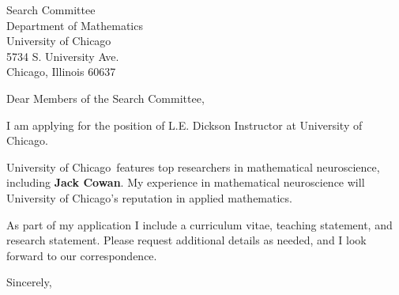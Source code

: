 \documentclass[11pt,a4paper]{letter}
\begin{document}

\def\School{University of Chicago}

\begin{letter}
{Search Committee\\
Department of Mathematics\\
University of Chicago\\
5734 S. University Ave.\\
Chicago, Illinois 60637}


\opening{Dear Members of the Search Committee,}

I am applying for the position of L.E. Dickson Instructor at \School. 



\School~features top researchers in mathematical neuroscience, including \textbf{Jack Cowan}. My experience in mathematical neuroscience will \School's reputation in applied mathematics.



As part of my application I include a curriculum vitae, teaching statement, and research statement. Please request additional details as needed, and I look forward to our correspondence.

\closing{Sincerely,}
\end{letter}
\end{document}
